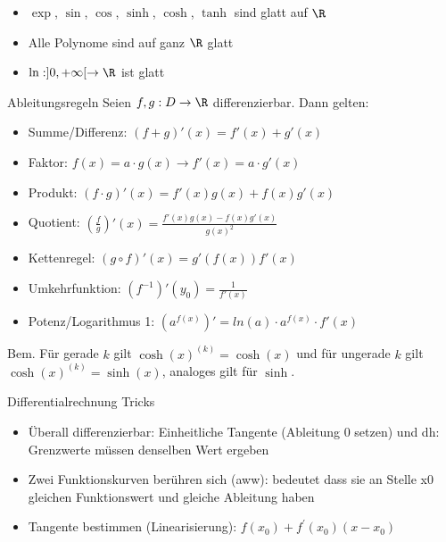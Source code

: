 \begin{itemize}
	\item $\exp$, $\sin$, $\cos$, $\sinh$, $\cosh$, $\tanh$ sind glatt auf $\R$
	\item Alle Polynome sind auf ganz $\R$ glatt
	\item $\ln : ]0, + \infty[ \to \R$ ist glatt
\end{itemize}


\begin{concept}{Ableitungsregeln}
    Seien $f,g: D \to \R$  differenzierbar. Dann gelten:
    \begin{itemize}
        \item Summe/Differenz: $(f + g)'(x) = f'(x) + g'(x)$
        \item Faktor: $f(x)=a\cdot g(x) \rightarrow f'(x)=a \cdot g'(x) $
        \item Produkt: $(f \cdot g)'(x) = f'(x)g(x) + f(x)g'(x)$
        \item Quotient: $\left(\frac{f}{g}\right)'(x) = \frac{f'(x) g(x) - f(x) g'(x)}{g(x)^2}$
        \item Kettenregel: $(g \circ f)' (x) = g'(f(x)) f'(x)$
        \item Umkehrfunktion: $\left(f^{-1}\right)'(y_0) = \frac{1}{f'(x)}$
        \item Potenz/Logarithmus 1: 
        $(a^{f(x)})' = ln(a) \cdot a^{f(x)} \cdot f'(x)$

    \end{itemize}
    Bem. Für gerade $k$ gilt $\cosh (x)^{(k)}=\cosh (x)$ und für ungerade $k$ gilt $\cosh (x)^{(k)}=\sinh (x)$, analoges gilt für $\sinh$.
\end{concept}

 \begin{KR}{Differentialrechnung Tricks}
        \begin{itemize}
      \item Überall differenzierbar: Einheitliche Tangente (Ableitung 0 setzen) und dh: Grenzwerte müssen denselben Wert ergeben
      \item Zwei Funktionskurven berühren sich (aww): bedeutet dass sie an Stelle x0 gleichen Funktionswert und gleiche Ableitung haben
      \item Tangente bestimmen (Linearisierung): $f\left(x_{0}\right)+f^{\prime}\left(x_{0}\right)\left(x-x_{0}\right)$
    \end{itemize}
    \end{KR}

